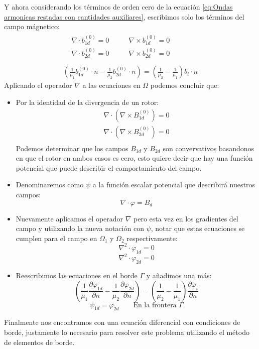 \documentclass[11pt]{article}
\begin{document}
Y ahora considerando los términos de orden cero de la ecuación \eqref{eq:Ondas armonicas restadas con cantidades auxiliares}, escribimos solo los términos del campo mágnetico:
\begin{equation}
\label{eq:Sistema Campo Magnetico}
\begin{gathered}
\begin{aligned}
&\nabla\cdot b_{1d}^{(0)}= 0\qquad & \nabla\times b_{1d}^{(0)}= 0\\
&\nabla\cdot b_{2d}^{(0)} = 0\qquad &  \nabla\times b_{2d}^{(0)}= 0\\
\end{aligned}\\
\left(\frac{1}{\mu_1}b_{1d}^{(0)}\cdot n-\frac{1}{\mu_2}b_{2d}^{(0)}\cdot n\right)=\left(\frac{1}{\mu_2}-\frac{1}{\mu_1}\right)b_i\cdot n
\end{gathered}
\end{equation}
Aplicando el operador $\nabla$ a las ecuaciones en $\Omega$ podemos concluir que:
\begin{itemize}
\item Por la identidad de la divergencia de un rotor:
\begin{equation*}
\begin{split}
\nabla \cdot (\nabla \times B_{1d}^{(0)})=0\\
\nabla \cdot (\nabla \times B_{2d}^{(0)})=0\\
\end{split}
\end{equation*}
Podemos determinar 	que los campos $B_{1d}$ y $B_{2d}$ son convervativos basandonos en que el rotor en ambos casos es cero, esto quiere decir que hay una función potencial que puede describir el comportamiento del campo.
\item Denominaremos como $\psi$ a la función escalar potencial que describirá nuestros campos:
$$\nabla \cdot \varphi = B_{d}$$
\item Nuevamente aplicamos el operador $\nabla$ pero esta vez en los gradientes del campo y utilizando la nueva notación con $\psi$, notar que estas ecuaciones se cumplen para el campo en $\Omega_1$ y $\Omega_2$ respectivamente:
$$\nabla^2\cdot \varphi_{1d}=0$$
$$\nabla^2\cdot \varphi_{2d}=0$$
\item Reescribimos las ecuaciones en el borde $\Gamma$ y añadimos una más:
$$\left(\frac{1}{\mu_1}\frac{\partial \varphi_{1d}}{\partial n}-\frac{1}{\mu_2}\frac{\partial \varphi_{2d}}{\partial n}\right)=\left(\frac{1}{\mu_2}-\frac{1}{\mu_1}\right)\frac{\partial \varphi_{i}}{\partial n}$$
$$\psi_{1d}=\varphi_{2d}\qquad\text{En la frontera }\Gamma$$
\end{itemize}
Finalmente nos encontramos con una ecuación diferencial con condiciones de borde, justamente lo necesario para resolver este problema utilizando el método de elementos de borde.
\end{document}
